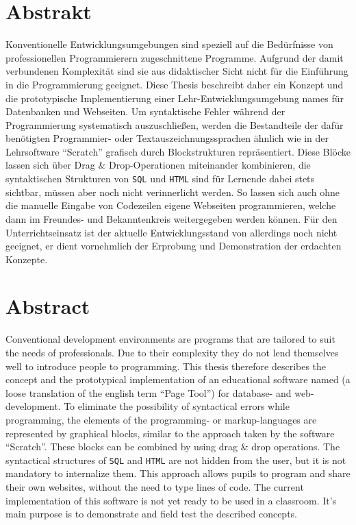 \begin{titlepage}

\section*{Abstrakt}

Konventionelle Entwicklungsumgebungen sind speziell auf die Bedürfnisse von professionellen Programmierern zugeschnittene Programme. Aufgrund der damit verbundenen Komplexität sind sie aus didaktischer Sicht nicht für die Einführung in die Programmierung geeignet. Diese Thesis beschreibt daher ein Konzept und die prototypische Implementierung einer Lehr-Entwicklungsumgebung names \idename{} für Datenbanken und Webseiten. Um syntaktische Fehler während der Programmierung systematisch auszuschließen, werden die Bestandteile der dafür benötigten Programmier- oder Textauszeichnungssprachen ähnlich wie in der Lehrsoftware "`Scratch"' grafisch durch Blockstrukturen repräsentiert. Diese Blöcke lassen sich über Drag \& Drop-Operationen miteinander kombinieren, die syntaktischen Strukturen von \texttt{SQL} und \texttt{HTML} sind für Lernende dabei stets sichtbar, müssen aber noch nicht verinnerlicht werden. So lassen sich auch ohne die manuelle Eingabe von Codezeilen eigene Webseiten programmieren, welche dann im Freundes- und Bekanntenkreis weitergegeben werden können. Für den Unterrichtseinsatz ist der aktuelle Entwicklungsstand von \idename{} allerdings noch nicht geeignet, er dient vornehmlich der Erprobung und Demonstration der erdachten Konzepte.

\section*{Abstract}

Conventional development environments are programs that are tailored to suit the needs of professionals. Due to their complexity they do not lend themselves well to introduce people to programming. This thesis therefore describes the concept and the prototypical implementation of an educational software named \idename{} (a loose translation of the english term ``Page Tool'') for database- and web-development. To eliminate the possibility of syntactical errors while programming, the elements of the programming- or markup-languages are represented by graphical blocks, similar to the approach taken by the software ``Scratch''. These blocks can be combined by using drag \& drop operations. The syntactical structures of \texttt{SQL} and \texttt{HTML} are not hidden from the user, but it is not mandatory to internalize them. This approach allows pupils to program and share their own websites, without the need to type lines of code. The current implementation of this software is not yet ready to be used in a classroom. It's main purpose is to demonstrate and field test the described concepts.

\end{titlepage}

